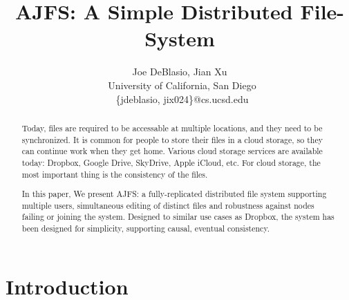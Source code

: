\documentclass[preprint]{sig-alternate-10pt}
\begin{document}



\title{AJFS: A Simple Distributed File-System}

\author{Joe DeBlasio, Jian Xu\\\
       University of California, San Diego \\\
       \{jdeblasio, jix024\}@cs.ucsd.edu}

\maketitle

\begin{abstract}
    Today, files are required to be accessable at multiple locations,
    and they need to be synchronized. It is common for people to
    store their files in a cloud storage, so they can continue work when they
    get home. Various cloud storage services are available today: Dropbox,
    Google Drive, SkyDrive, Apple iCloud, etc. For cloud storage, the most
    important thing is the consistency of the files.

    In this paper, We present AJFS: a fully-replicated distributed file system supporting
    multiple users, simultaneous editing of distinct files and robustness
    against nodes failing or joining the system. Designed to similar use cases
    as Dropbox, the system has been designed for simplicity, supporting causal,
    eventual consistency.
\end{abstract}

\section{Introduction}
\label{sec:introduction}

\end{document}
